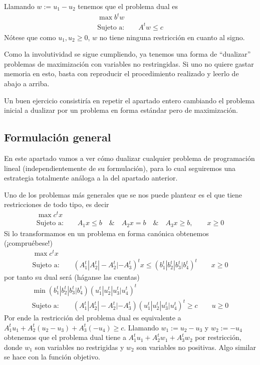 Llamando $w:=u_1-u_2$ tenemos que el problema dual es
\begin{equation*}
\begin{array}{c}
\max b^tw\\
\text{Sujeto a:}\qquad A^tw\leq c
\end{array}
\end{equation*}
Nótese que como $u_1,u_2\geq 0$, $w$ no tiene ninguna restricción en cuanto al signo.

Como la involutividad se sigue cumpliendo, ya tenemos una forma de ``dualizar'' problemas de maximización con variables no restringidas. Si uno no quiere gastar memoria en esto, basta con reproducir el procedimiento realizado y leerlo de abajo a arriba.

Un buen ejercicio consistiría en repetir el apartado entero cambiando el problema inicial a dualizar por un problema en forma estándar pero de maximización.
\subsection{Formulación general}
En este apartado vamos a ver cómo dualizar cualquier problema de programación lineal (independientemente de su formulación), para lo cual seguiremos una estrategia totalmente análoga a la del apartado anterior.

Uno de los problemas más generales que se nos puede plantear es el que tiene restricciones de todo tipo, es decir
 \begin{equation*}
 \begin{array}{c}
 \max c^tx\\
 \text{Sujeto a:}\qquad A_1x\leq b\quad \&\quad A_2x=b\quad\&\quad A_3x\geq b,\qquad x\geq 0
 \end{array}
 \end{equation*}
 Si lo transformamos en un problema en forma canónica obtenemos (¡compruébese!)
 \begin{equation*}
 \begin{array}{c}
 \max c^tx\\
 \text{Sujeto a:}\qquad (A_1^t|A_2^t|-A_2^t|-A_3^t)^tx\leq (b_1^t|b_2^t|b_3^t|b_4^t)^t\qquad x\geq 0
 \end{array}
 \end{equation*}
 por tanto su dual será (háganse las cuentas)
  \begin{equation*}
  \begin{array}{c}
  \min (b_1^t|b_2^t|b_3^t|b_4^t)(u_1^t|u_2^t|u_3^t|u_4^t)^t\\
  \text{Sujeto a:}\qquad (A_1^t|A_2^t|-A_2^t|-A_3^t)(u_1^t|u_2^t|u_3^t|u_4^t)^t\geq c\qquad u\geq 0
  \end{array}
  \end{equation*}
  Por ende la restricción del problema dual es equivalente a $A_1^tu_1+A_2^t(u_2-u_3)+A_3^t(-u_4)\geq c$. Llamando $w_1:=u_2-u_3$ y $w_2:=-u_4$ obtenemos que el problema dual tiene a $A_1^tu_1+A_2^tw_1+A_3^tw_2$ por restricción, donde $w_1$ son variables no restrigidas y $w_2$ son variables no positivas. Algo similar se hace con la función objetivo.
  
